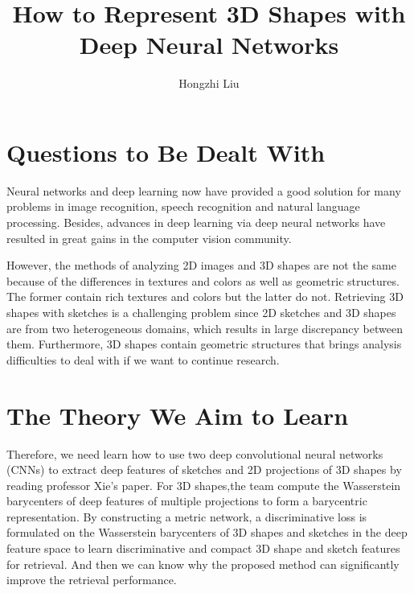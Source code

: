 \documentclass{article}
\author{Hongzhi Liu}
\title{How to Represent 3D Shapes with Deep Neural Networks}
\begin{document}
\maketitle
  \par
  \section{Questions to Be Dealt With}
  Neural networks and deep learning now have provided a good solution for many problems in image recognition, speech recognition and natural language processing. Besides, advances in deep learning via deep neural networks have resulted in great gains in the computer vision community.

  However, the methods of analyzing 2D images and 3D shapes are not the same because of the differences in textures and colors as well as geometric structures. The former contain rich textures and colors but the latter do not. Retrieving 3D shapes with sketches is a challenging problem since 2D sketches and 3D shapes are from two heterogeneous domains, which results in large discrepancy between them. Furthermore, 3D shapes contain geometric structures that brings analysis difficulties to deal with if we want to continue research.

\section{The Theory We Aim to Learn}

  Therefore, we need learn how to use two deep convolutional neural networks (CNNs) to extract deep features of sketches and 2D projections of 3D shapes by reading professor Xie's paper. For 3D shapes,the team compute the Wasserstein barycenters of deep features of multiple projections to form a barycentric representation. By constructing a metric network, a discriminative loss is formulated on the Wasserstein barycenters of 3D shapes and sketches in the deep feature space to learn discriminative and compact 3D shape and sketch features for retrieval. And then we can know why the proposed method can significantly improve the retrieval performance.
\end{document}

